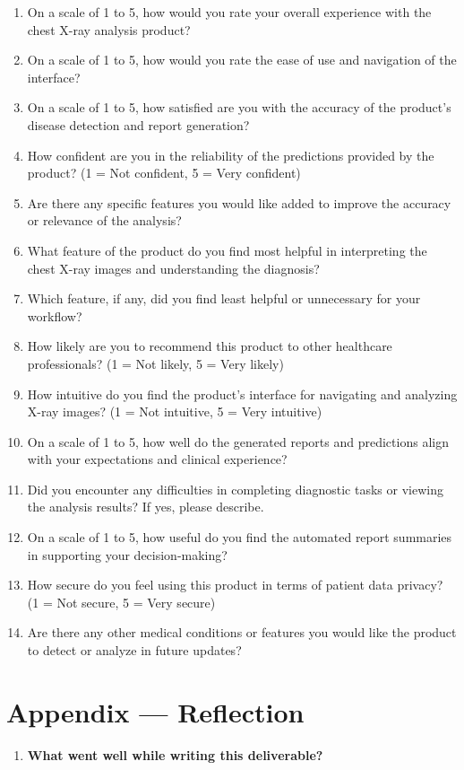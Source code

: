\documentclass[12pt, titlepage]{article}
\begin{document}
\begin{enumerate}
\begin{enumerate}
\begin{enumerate}
\begin{enumerate}
  \item On a scale of 1 to 5, how would you rate your overall experience with the chest X-ray analysis product?
  \item On a scale of 1 to 5, how would you rate the ease of use and navigation of the interface?
  \item On a scale of 1 to 5, how satisfied are you with the accuracy of the product's disease detection and report generation?
  \item How confident are you in the reliability of the predictions provided by the product? (1 = Not confident, 5 = Very confident)
  \item Are there any specific features you would like added to improve the accuracy or relevance of the analysis?
  \item What feature of the product do you find most helpful in interpreting the chest X-ray images and understanding the diagnosis?
  \item Which feature, if any, did you find least helpful or unnecessary for your workflow?
  \item How likely are you to recommend this product to other healthcare professionals? (1 = Not likely, 5 = Very likely)
  \item How intuitive do you find the product’s interface for navigating and analyzing X-ray images? (1 = Not intuitive, 5 = Very intuitive)
  \item On a scale of 1 to 5, how well do the generated reports and predictions align with your expectations and clinical experience?
  \item Did you encounter any difficulties in completing diagnostic tasks or viewing the analysis results? If yes, please describe.
  \item On a scale of 1 to 5, how useful do you find the automated report summaries in supporting your decision-making?
  \item How secure do you feel using this product in terms of patient data privacy? (1 = Not secure, 5 = Very secure)
  \item Are there any other medical conditions or features you would like the product to detect or analyze in future updates?
\end{enumerate}




\newpage{}
\section*{Appendix --- Reflection}
\begin{enumerate}
  \item \textbf{What went well while writing this deliverable?}
  

\end{enumerate}
\end{enumerate}
\end{enumerate}
\end{enumerate}
\end{document}

